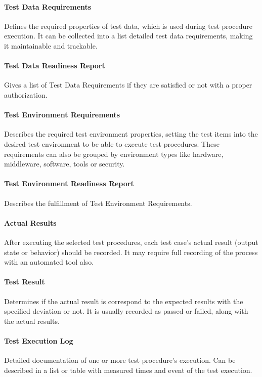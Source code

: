 \paragraph{Test Data Requirements}
Defines the required properties of test data, which is used during test procedure execution. It can be collected into a list detailed test data requirements, making it maintainable and trackable. 

\paragraph{Test Data Readiness Report} 
Gives a list of Test Data Requirements if they are satisfied or not with a proper authorization.

\paragraph{Test Environment Requirements}
Describes the required test environment properties, setting the test items into the desired test environment to be able to execute test procedures. These requirements can also be grouped by environment types like hardware, middleware, software, tools or security.

\paragraph{Test Environment Readiness Report}
Describes the fulfillment of Test Environment Requirements.

\paragraph{Actual Results}
After executing the selected test procedures, each test case's actual result (output state or behavior) should be recorded. It may require full recording of the process with an automated tool also.

\paragraph{Test Result}
Determines if the actual result is correspond to the expected results with the specified deviation or not. It is usually recorded as passed or failed, along with the actual results.

\paragraph{Test Execution Log}
Detailed documentation of one or more test procedure's execution. Can be described in a list or table with measured times and event of the test execution.

